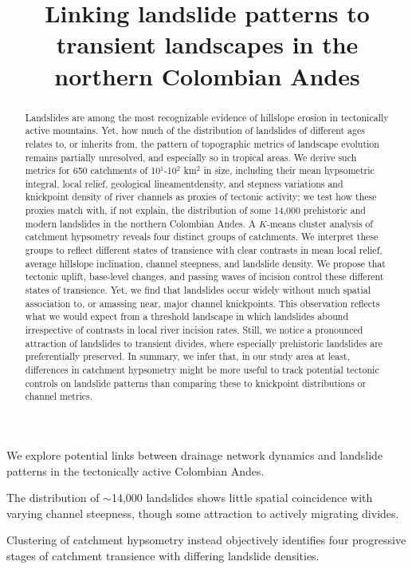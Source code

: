 \documentclass[draft]{agujournal2019}
\begin{document}
\title{Linking landslide patterns to transient landscapes in the northern Colombian Andes}




\begin{keypoints}
\item We explore potential links between drainage network dynamics and landslide patterns in the tectonically active Colombian Andes.
\item The distribution of $\sim$14,000 landslides shows little spatial coincidence with varying channel steepness, though some attraction to actively migrating divides.
\item Clustering of catchment hypsometry instead objectively identifies four progressive stages of catchment transience with differing landslide densities.
\end{keypoints}

\begin{abstract}
Landslides are among the most recognizable evidence of hillslope erosion in tectonically active mountains. Yet, how much of the distribution of landslides of different ages relates to, or inherits from, the pattern of topographic metrics of landscape evolution remains partially unresolved, and especially so in tropical areas. We derive such metrics for 650 catchments of 10$^1$-10$^2$ km$^2$ in size, including their mean hypsometric integral, local relief, geological lineamentdensity, and stepness variations and knickpoint density of river channels as proxies of tectonic activity; we test how these proxies match with, if not explain, the distribution of some 14,000 prehistoric and modern landslides in the northern Colombian Andes. A $K$-means cluster analysis of catchment hypsometry reveals four distinct groups of catchments. We interpret these groups to reflect different states of transience with clear contrasts in mean local relief, average hillslope inclination, channel steepness, and landslide density. We propose that tectonic uplift, base-level changes, and passing waves of incision control these different states of transience. Yet, we find that landslides occur widely without much spatial association to, or amassing near, major channel knickpoints. This observation reflects what we would expect from a threshold landscape in which landslides abound irrespective of contrasts in local river incision rates. Still, we notice a pronounced attraction of landslides to transient divides, where especially prehistoric landslides are preferentially preserved. In summary, we infer that, in our study area at least, differences in catchment hypsometry might be more useful to track potential tectonic controls on landslide patterns than comparing these to knickpoint distributions or channel metrics.
\end{abstract}
\end{document}
